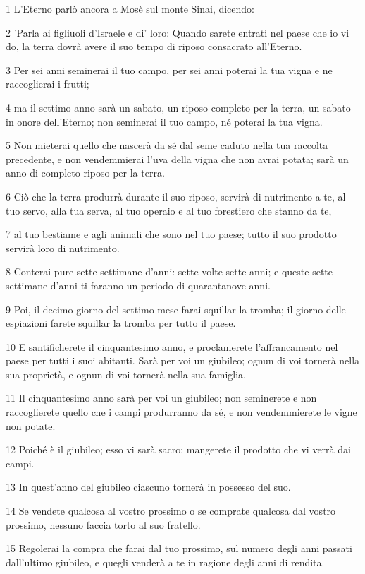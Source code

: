 \par 1 L'Eterno parlò ancora a Mosè sul monte Sinai, dicendo:
\par 2 'Parla ai figliuoli d'Israele e di' loro: Quando sarete entrati nel paese che io vi do, la terra dovrà avere il suo tempo di riposo consacrato all'Eterno.
\par 3 Per sei anni seminerai il tuo campo, per sei anni poterai la tua vigna e ne raccoglierai i frutti;
\par 4 ma il settimo anno sarà un sabato, un riposo completo per la terra, un sabato in onore dell'Eterno; non seminerai il tuo campo, né poterai la tua vigna.
\par 5 Non mieterai quello che nascerà da sé dal seme caduto nella tua raccolta precedente, e non vendemmierai l'uva della vigna che non avrai potata; sarà un anno di completo riposo per la terra.
\par 6 Ciò che la terra produrrà durante il suo riposo, servirà di nutrimento a te, al tuo servo, alla tua serva, al tuo operaio e al tuo forestiero che stanno da te,
\par 7 al tuo bestiame e agli animali che sono nel tuo paese; tutto il suo prodotto servirà loro di nutrimento.
\par 8 Conterai pure sette settimane d'anni: sette volte sette anni; e queste sette settimane d'anni ti faranno un periodo di quarantanove anni.
\par 9 Poi, il decimo giorno del settimo mese farai squillar la tromba; il giorno delle espiazioni farete squillar la tromba per tutto il paese.
\par 10 E santificherete il cinquantesimo anno, e proclamerete l'affrancamento nel paese per tutti i suoi abitanti. Sarà per voi un giubileo; ognun di voi tornerà nella sua proprietà, e ognun di voi tornerà nella sua famiglia.
\par 11 Il cinquantesimo anno sarà per voi un giubileo; non seminerete e non raccoglierete quello che i campi produrranno da sé, e non vendemmierete le vigne non potate.
\par 12 Poiché è il giubileo; esso vi sarà sacro; mangerete il prodotto che vi verrà dai campi.
\par 13 In quest'anno del giubileo ciascuno tornerà in possesso del suo.
\par 14 Se vendete qualcosa al vostro prossimo o se comprate qualcosa dal vostro prossimo, nessuno faccia torto al suo fratello.
\par 15 Regolerai la compra che farai dal tuo prossimo, sul numero degli anni passati dall'ultimo giubileo, e quegli venderà a te in ragione degli anni di rendita.
